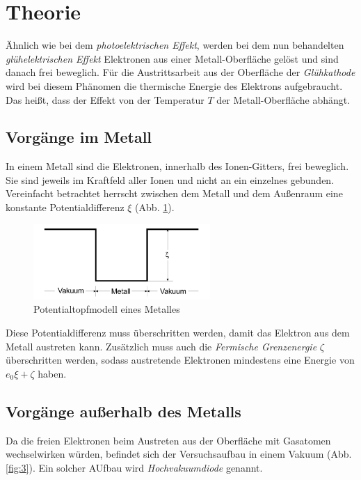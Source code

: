 \section{Theorie}
\label{sec:Theorie}

Ähnlich wie bei dem \textit{photoelektrischen Effekt}, werden bei dem nun behandelten \textit{glühelektrischen Effekt}
Elektronen aus einer Metall-Oberfläche gelöst und sind danach frei beweglich. 
Für die Austrittsarbeit aus der Oberfläche der \textit{Glühkathode} wird bei diesem Phänomen die thermische Energie des Elektrons aufgebraucht.
Das heißt, dass der Effekt von der Temperatur $T$ der Metall-Oberfläche abhängt.




\subsection{Vorgänge im Metall}
\label{subsec:vim}
In einem Metall sind die Elektronen, innerhalb des Ionen-Gitters, frei beweglich. Sie sind jeweils im Kraftfeld aller Ionen und nicht an ein einzelnes gebunden. Vereinfacht betrachtet
herrscht zwischen dem Metall und dem Außenraum eine konstante Potentialdifferenz $\xi$ (Abb. \ref{fig:1}).

\begin{figure}[H]
  \centering
  \includegraphics[width=0.6\textwidth]{content/1.png}
  \caption{Potentialtopfmodell eines Metalles \cite{sample}}
  \label{fig:1}
\end{figure}

Diese Potentialdifferenz muss überschritten werden, damit das Elektron aus dem Metall austreten kann. Zusätzlich muss auch 
die \textit{Fermische Grenzenergie} $\zeta$ überschritten werden, sodass austretende Elektronen mindestens eine Energie von
$e_0 \xi + \zeta $ haben.



\subsection{Vorgänge außerhalb des Metalls}
\label{subsec:vadm}
Da die freien Elektronen beim Austreten aus der Oberfläche mit Gasatomen wechselwirken würden, befindet sich der Versuchsaufbau in einem Vakuum (Abb. \ref{fig:3}). Ein solcher AUfbau wird \textit{Hochvakuumdiode} genannt.

